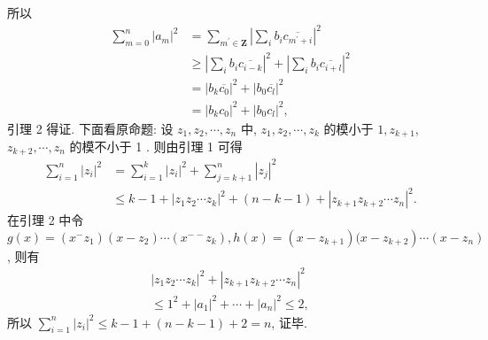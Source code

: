 所以
$$
\begin{aligned}
\sum_{m=0}^n\left|a_m\right|^2 & =\sum_{m^{\prime} \in \mathbf{Z}}\left|\sum_i b_i \overline{c_{m^{\prime}+i}}\right|^2 \\
& \geqslant\left|\sum_i b_i \overline{c_{i-k}}\right|^2+\left|\sum_i b_i \overline{c_{i+l}}\right|^2 \\
& =\left|b_k \overline{c_0}\right|^2+\left|b_0 \overline{c_l}\right|^2 \\
& =\left|b_k c_0\right|^2+\left|b_0 c_l\right|^2,
\end{aligned}
$$
引理 2 得证.
下面看原命题: 设 $z_1, z_2, \cdots, z_n$ 中, $z_1, z_2, \cdots, z_k$ 的模小于 $1, z_{k+1}$, $z_{k+2}, \cdots, z_n$ 的模不小于 1 . 则由引理 1 可得
$$
\begin{aligned}
\sum_{i=1}^n\left|z_i\right|^2 & =\sum_{i=1}^k\left|z_i\right|^2+\sum_{j=k+1}^n\left|z_j\right|^2 \\
& \leqslant k-1+\left|z_1 z_2 \cdots z_k\right|^2+(n-k-1)+\left|z_{k+1} z_{k+2} \cdots z_n\right|^2 .
\end{aligned}
$$
在引理 2 中令 $g(x)=\left(x^{-} z_1\right)\left(x-z_2\right) \cdots\left(x^{--} z_k\right), h(x)=\left(x-z_{k+1}\right)(x- \left.z_{k+2}\right) \cdots\left(x-z_n\right)$, 则有
$$
\begin{gathered}
\left|z_1 z_2 \cdots z_k\right|^2+\left|z_{k+1} z_{k+2} \cdots z_n\right|^2 \\
\leqslant 1^2+\left|a_1\right|^2+\cdots+\left|a_n\right|^2 \leqslant 2,
\end{gathered}
$$
所以 $\sum_{i=1}^n\left|z_i\right|^2 \leqslant k-1+(n-k-1)+2=n$, 证毕.


